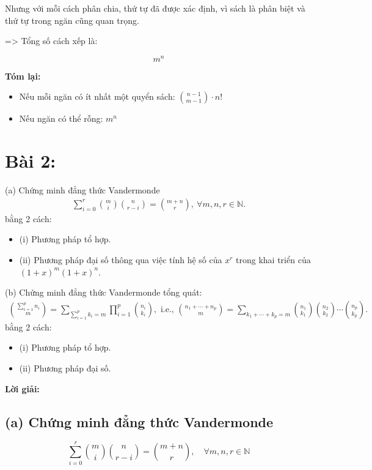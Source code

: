 \documentclass{article}
\begin{document}
	Nhưng với mỗi cách phân chia, thứ tự đã được xác định, vì sách là phân biệt và thứ tự trong ngăn cũng quan trọng.
	
	=> Tổng số cách xếp là:
	
	\[
	\boxed{m^n}
	\]
	
	\vspace{1em}
	\noindent\textbf{Tóm lại:}
	
	\begin{itemize}[leftmargin=2em]
		\item[(a)] Nếu mỗi ngăn có ít nhất một quyển sách: \quad $\boxed{\binom{n-1}{m-1} \cdot n!}$
		\item[(b)] Nếu ngăn có thể rỗng: \quad $\boxed{m^n}$
	\end{itemize}
	
	\section*{Bài 2:}
	 (a) Chứng minh đẳng thức Vandermonde
	\begin{align*}
		\sum_{i=0}^r \binom{m}{i}\binom{n}{r - i} = \binom{m + n}{r},\ \forall m,n,r\in\mathbb{N}.
	\end{align*}
	bằng 2 cách: 
	\begin{itemize}
		\item (i) Phương pháp tổ hợp.
		\item (ii) Phương pháp đại số thông qua việc tính hệ số của $x^r$ trong khai triển của $(1 + x)^m(1 + x)^n$.
	\end{itemize}
	  (b) Chứng minh đẳng thức Vandermonde tổng quát:
	\begin{align*}
		\binom{\sum_{i=1}^p n_i}{m} = \sum_{\sum_{i=1}^p k_i = m} \prod_{i=1}^p \binom{n_i}{k_i},\mbox{ i.e., }\binom{n_1 + \cdots + n_p}{m} = \sum_{k_1 + \cdots + k_p = m} \binom{n_1}{k_1}\binom{n_2}{k_2}\cdots\binom{n_p}{k_p}.
	\end{align*}
	bằng 2 cách: 
	\begin{itemize}
		\item (i) Phương pháp tổ hợp.
		\item (ii) Phương pháp đại số.
	\end{itemize}
	 
	 \noindent \textbf{Lời giải:}
	 
	 \subsection*{(a) Chứng minh đẳng thức Vandermonde}
	 \[
	 \sum_{i=0}^r \binom{m}{i} \binom{n}{r - i} = \binom{m + n}{r},\quad \forall m,n,r \in \mathbb{N}
	 \]
	 
\end{document}
